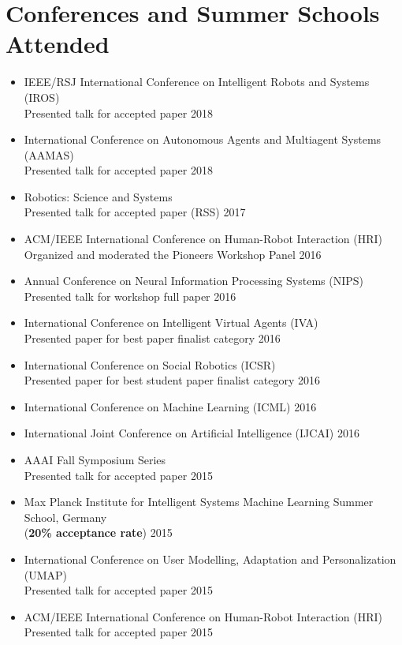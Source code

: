 \documentclass[10pt,letterpaper]{article}
\newcommand{\thing}[2]{{#1} \hfill {#2}}
\begin{document}
\section{Conferences and Summer Schools Attended}
\begin{itemize}%
\item \thing{IEEE/RSJ International Conference on Intelligent Robots and Systems (IROS)\\Presented talk for accepted paper}{2018}
\item \thing{International Conference on Autonomous Agents and Multiagent Systems (AAMAS)\\Presented talk for accepted paper}{2018}
\item \thing{Robotics: Science and Systems\\Presented talk for accepted paper (RSS)}{2017}
\item \thing{ACM/IEEE International Conference on Human-Robot Interaction (HRI)\\Organized and moderated the Pioneers Workshop Panel}{2016}
\item \thing{Annual Conference on Neural Information Processing Systems (NIPS)\\Presented talk for workshop full paper}{2016}
\item \thing{International Conference on Intelligent Virtual Agents (IVA)\\Presented paper for best paper finalist category}{2016}
\item \thing{International Conference on Social Robotics (ICSR)\\Presented paper for best student paper finalist category}{2016}
\item \thing{International Conference on Machine Learning (ICML)}{2016}
\item \thing{International Joint Conference on Artificial Intelligence (IJCAI)}{2016}
\item \thing{AAAI Fall Symposium Series\\Presented talk for accepted paper}{2015}
\item \thing{Max Planck Institute for Intelligent Systems Machine Learning Summer School, Germany\\({\bf 20\% acceptance rate})}{2015}
\item \thing{International Conference on User Modelling, Adaptation and Personalization (UMAP)\\Presented talk for accepted paper}{2015}
\item \thing{ACM/IEEE International Conference on Human-Robot Interaction (HRI)\\Presented talk for accepted paper}{2015}

\end{itemize}
\end{document}
